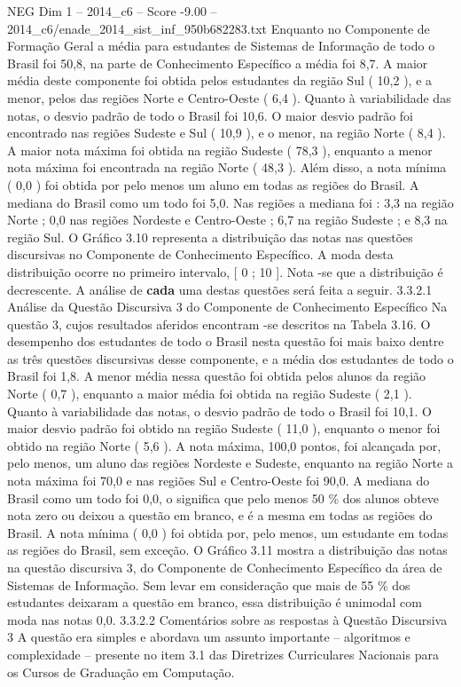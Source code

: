 \begin{textsample}{NEG Dim 1 – 2014\_c6 – Score -9.00 – 2014\_c6/enade\_2014\_sist\_inf\_950b682283.txt}
Enquanto no Componente de Formação Geral a média para estudantes de Sistemas de Informação de todo o Brasil foi 50,8, na parte de Conhecimento Específico a média foi 8,7.
A maior média deste componente foi obtida pelos estudantes da região Sul ( 10,2 ), e a menor, pelos das regiões Norte e Centro-Oeste ( 6,4 ).
Quanto à variabilidade das notas, o desvio padrão de todo o Brasil foi 10,6.
O maior desvio padrão foi encontrado nas regiões Sudeste e Sul ( 10,9 ), e o menor, na região Norte ( 8,4 ).
A maior nota máxima foi obtida na região Sudeste ( 78,3 ), enquanto a menor nota máxima foi encontrada na região Norte ( 48,3 ).
Além disso, a nota mínima ( 0,0 ) foi obtida por pelo menos um aluno em todas as regiões do Brasil.
A mediana do Brasil como um todo foi 5,0.
Nas regiões a mediana foi : 3,3 na região Norte ; 0,0 nas regiões Nordeste e Centro-Oeste ; 6,7 na região Sudeste ; e 8,3 na região Sul.
O Gráfico 3.10 representa a distribuição das notas nas questões discursivas no Componente de Conhecimento Específico.
A moda desta distribuição ocorre no primeiro intervalo, [ 0 ; 10 ].
Nota -se que a distribuição é decrescente.
A análise de \textbf{cada} uma destas questões será feita a seguir. 3.3.2.1 Análise da Questão Discursiva 3 do Componente de Conhecimento Específico Na questão 3, cujos resultados aferidos encontram -se descritos na Tabela 3.16.
O desempenho dos estudantes de todo o Brasil nesta questão foi mais baixo dentre as três questões discursivas desse componente, e a média dos estudantes de todo o Brasil foi 1,8.
A menor média nessa questão foi obtida pelos alunos da região Norte ( 0,7 ), enquanto a maior média foi obtida na região Sudeste ( 2,1 ).
Quanto à variabilidade das notas, o desvio padrão de todo o Brasil foi 10,1.
O maior desvio padrão foi obtido na região Sudeste ( 11,0 ), enquanto o menor foi obtido na região Norte ( 5,6 ).
A nota máxima, 100,0 pontos, foi alcançada por, pelo menos, um aluno das regiões Nordeste e Sudeste, enquanto na região Norte a nota máxima foi 70,0 e nas regiões Sul e Centro-Oeste foi 90,0.
A mediana do Brasil como um todo foi 0,0, o significa que pelo menos 50 \% dos alunos obteve nota zero ou deixou a questão em branco, e é a mesma em todas as regiões do Brasil.
A nota mínima ( 0,0 ) foi obtida por, pelo menos, um estudante em todas as regiões do Brasil, sem exceção.
O Gráfico 3.11 mostra a distribuição das notas na questão discursiva 3, do Componente de Conhecimento Específico da área de Sistemas de Informação.
Sem levar em consideração que mais de 55 \% dos estudantes deixaram a questão em branco, essa distribuição é unimodal com moda nas notas 0,0. 3.3.2.2 Comentários sobre as respostas à Questão Discursiva 3 A questão era simples e abordava um assunto importante – algoritmos e complexidade – presente no item 3.1 das Diretrizes Curriculares Nacionais para os Cursos de Graduação em Computação.

\end{textsample}
